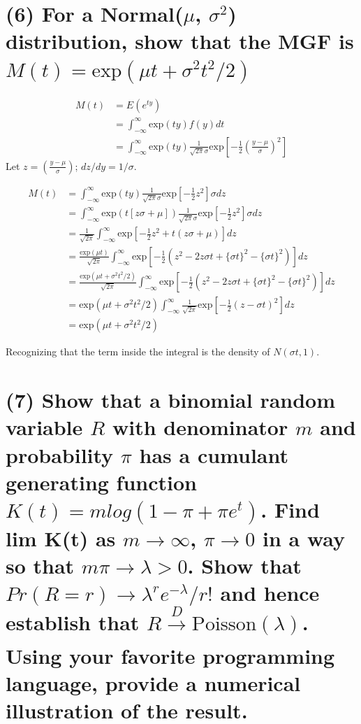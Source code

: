 \documentclass[11pt]{article}
\begin{document}
\section*{(6) For a Normal($\mu$, $\sigma^2$)
distribution, show that the MGF is $M(t) =\text{exp}(\mu t + \sigma^2t^2/2)$}


\begin{align*}
    M(t) &= E(e^{ty})\\
     &=\int_{-\infty}^{\infty} \text{exp}(ty)f(y)dt\\
     &= \int_{-\infty}^{\infty} \text{exp}(ty) \frac{1}{\sqrt{2\pi}\sigma}\text{exp}\left[ -\frac{1}{2}\left(\frac{y-\mu}{\sigma} \right )^2\right]
\end{align*}
Let $z = \left(\frac{y-\mu}{\sigma} \right )$; $dz/dy = 1/\sigma$.

\begin{align*}
    M(t) &= \int_{-\infty}^{\infty} \text{exp}(ty) \frac{1}{\sqrt{2\pi}\sigma}\text{exp}\left[ -\frac{1}{2}z^2\right]\sigma dz\\
    &= \int_{-\infty}^{\infty} \text{exp}(t[z\sigma+\mu]) \frac{1}{\sqrt{2\pi}\sigma}\text{exp}\left[ -\frac{1}{2}z^2\right]\sigma dz\\
    &=  \frac{1}{\sqrt{2\pi}} \int_{-\infty}^{\infty}  \text{exp}\left[ -\frac{1}{2}z^2+t(z\sigma+\mu)\right] dz\\
     &=  \frac{\text{exp}(\mu t)}{\sqrt{2\pi}} \int_{-\infty}^{\infty}  \text{exp}\left[ -\frac{1}{2}(z^2-2z\sigma t + \{\sigma t\}^2 - \{\sigma t\}^2 )\right] dz\\
         &=  \frac{\text{exp}(\mu t + \sigma^2t^2/2)}{\sqrt{2\pi}} \int_{-\infty}^{\infty}  \text{exp}\left[ -\frac{1}{2}(z^2-2z\sigma t + \{\sigma t\}^2 - \{\sigma t\}^2 )\right] dz\\
          &=  \text{exp}(\mu t + \sigma^2t^2/2) \int_{-\infty}^{\infty}  \frac{1}{\sqrt{2 \pi }} \text{exp}\left[ -\frac{1}{2}(z- \sigma t )^2\right] dz\\
           &=  \text{exp}(\mu t + \sigma^2t^2/2)
\end{align*}

Recognizing that the term inside the integral is the density of $N(\sigma t, 1)$.


\section*{(7) Show that a binomial random variable $R$ with denominator $m$ and probability $\pi$ has a cumulant generating function $K(t)=mlog(1-\pi+\pi e^t)$. Find lim K(t) as $m \rightarrow \infty$,  $\pi \rightarrow 0$ in a way so that $m\pi \rightarrow \lambda > 0$. Show that $Pr(R=r) \rightarrow \lambda^re^{-\lambda}/r!$ and hence establish that $R \xrightarrow[]{D} \text{Poisson}(\lambda)$. Using your favorite programming language, provide a numerical illustration of the result.}
\end{document}
